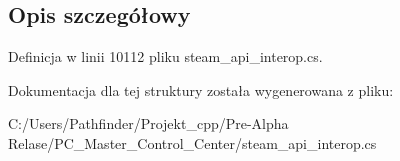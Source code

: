 \subsection{Opis szczegółowy}


Definicja w linii 10112 pliku steam\+\_\+api\+\_\+interop.\+cs.



Dokumentacja dla tej struktury została wygenerowana z pliku\+:\begin{DoxyCompactItemize}
\item 
C\+:/\+Users/\+Pathfinder/\+Projekt\+\_\+cpp/\+Pre-\/\+Alpha Relase/\+P\+C\+\_\+\+Master\+\_\+\+Control\+\_\+\+Center/steam\+\_\+api\+\_\+interop.\+cs\end{DoxyCompactItemize}
